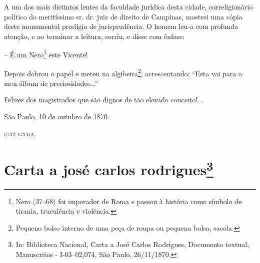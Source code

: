{A um dos mais distintos lentes da faculdade jurídica desta cidade,
correligionário político do meritíssimo sr. dr. juiz de direito de
Campinas, mostrei uma cópia deste monumental prodígio de jurisprudência.
O homem leu-a com profunda atenção, e ao terminar a leitura, sorriu, e
disse com ênfase:

-- É um Nero\footnote{ Nero (37--68) foi imperador de Roma e passou à
  história como símbolo de tirania, truculência e violência.} este
Vicente!

Depois dobrou o papel e meteu na algibeira\footnote{ Pequeno bolso
  interno de uma peça de roupa ou pequena bolsa, sacola.},
acrescentando: ``Esta vai para o meu álbum de preciosidades...''

Felizes dos magistrados que são dignos de tão elevado conceito!...
\begin{flushright}
São Paulo, 10 de outubro de 1870.

\textsc{luiz gama}.
\end{flushright}

\chapter{Carta a josé carlos rodrigues\footnote{ In: Biblioteca Nacional, Carta a José Carlos Rodrigues,
  Documento textual, Manuscritos - I-03--02,074, São Paulo, 26/11/1870.}} %

}
